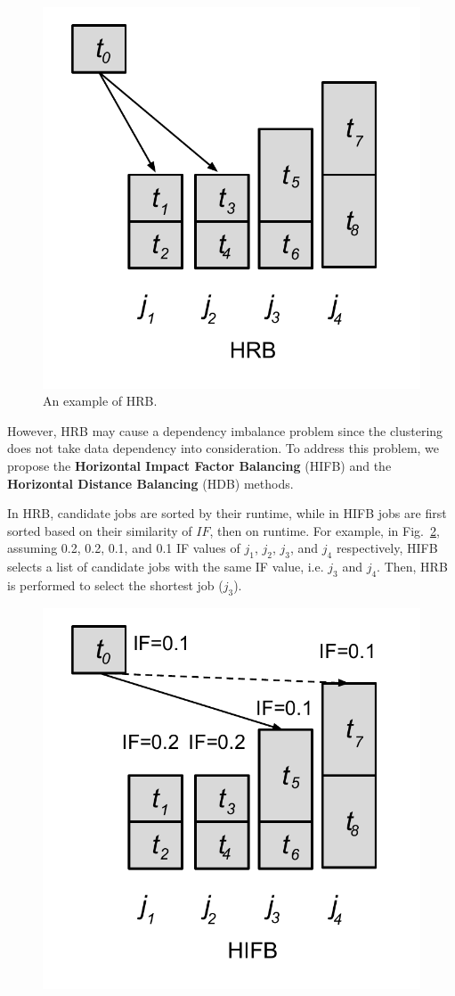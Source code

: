 \begin{figure}[htb]
	\centering
	\includegraphics[width=0.5\linewidth]{figures/imbalance/algorithm_hrb.pdf}
	\caption{An example of HRB.}
	\label{fig:imbalance_hrb}
\end{figure}

However, HRB may cause a dependency imbalance problem since the clustering does not take data dependency into consideration. To address this problem, we propose the \textbf{Horizontal Impact Factor Balancing} (HIFB) and the \textbf{Horizontal Distance Balancing} (HDB) methods. 

In HRB, candidate jobs are sorted by their runtime, while in HIFB jobs are first sorted based on their similarity of $IF$, then on runtime. For example, in Fig.~\ref{fig:imbalance_hifb}, assuming 0.2, 0.2, 0.1, and 0.1 IF values of $j_1$, $j_2$, $j_3$, and $j_4$ respectively, HIFB selects a list of candidate jobs with the same IF value, i.e. $j_3$ and $j_4$. Then, HRB is performed to select the shortest job ($j_3$). 

\begin{figure}[htb]
	\centering
	\includegraphics[width=0.5\linewidth]{figures/imbalance/algorithm_hifb.pdf}
	\label{fig:imbalance_hifb}
\end{figure}

